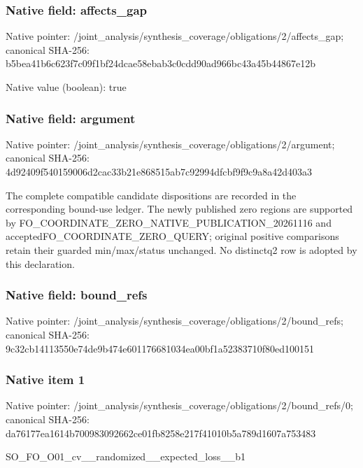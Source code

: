\documentclass[10pt,a4paper]{article}
\begin{document}
\subsubsection{Native field: affects\_\allowbreak{}gap}
Native pointer: /joint\_\allowbreak{}analysis/synthesis\_\allowbreak{}coverage/obligations/2/affects\_\allowbreak{}gap; canonical SHA-256: b5bea41b6c623f7c09f1bf24dcae58ebab3c0cdd90ad966bc43a45b44867e12b

Native value (boolean): true

\subsubsection{Native field: argument}
Native pointer: /joint\_\allowbreak{}analysis/synthesis\_\allowbreak{}coverage/obligations/2/argument; canonical SHA-256: 4d92409f540159006d2cac33b21e868515ab7c92994dfcbf9f9c9a8a42d403a3

\begingroup\raggedright\sloppy The complete compatible candidate dispositions are recorded in the corresponding bound-use ledger. The newly published zero regions are supported by FO\_\allowbreak{}COORDINATE\_\allowbreak{}ZERO\_\allowbreak{}NATIVE\_\allowbreak{}PUBLICATION\_\allowbreak{}20261116 and acceptedFO\_\allowbreak{}COORDINATE\_\allowbreak{}ZERO\_\allowbreak{}QUERY;\allowbreak{} original positive comparisons retain their guarded min/\allowbreak{}max/\allowbreak{}status unchanged. No distinctq2 row is adopted by this declaration.\par\endgroup

\subsubsection{Native field: bound\_\allowbreak{}refs}
Native pointer: /joint\_\allowbreak{}analysis/synthesis\_\allowbreak{}coverage/obligations/2/bound\_\allowbreak{}refs; canonical SHA-256: 9c32cb14113550e74de9b474e601176681034ea00bf1a52383710f80ed100151

\subsubsection{Native item 1}
Native pointer: /joint\_\allowbreak{}analysis/synthesis\_\allowbreak{}coverage/obligations/2/bound\_\allowbreak{}refs/0; canonical SHA-256: da76177ea1614b700983092662ce01fb8258e217f41010b5a789d1607a753483

\begingroup\raggedright\sloppy SO\_\allowbreak{}FO\_\allowbreak{}O01\_\allowbreak{}cv\_\allowbreak{}\_\allowbreak{}randomized\_\allowbreak{}\_\allowbreak{}expected\_\allowbreak{}loss\_\allowbreak{}\_\allowbreak{}b1\par\endgroup
\end{document}
